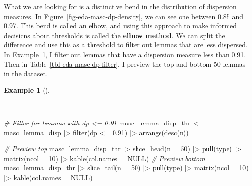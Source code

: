 \documentclass[
  letterpaper,
]{latex/krantz}
\newenvironment{Shaded}{\begin{snugshade}}{\end{snugshade}}
\newcommand{\AttributeTok}[1]{\textcolor[rgb]{0.00,0.00,0.00}{#1}}
\newcommand{\CommentTok}[1]{\textcolor[rgb]{0.00,0.00,0.00}{\textit{#1}}}
\newcommand{\ConstantTok}[1]{\textcolor[rgb]{0.00,0.00,0.00}{#1}}
\newcommand{\DecValTok}[1]{\textcolor[rgb]{0.00,0.00,0.00}{#1}}
\newcommand{\FloatTok}[1]{\textcolor[rgb]{0.00,0.00,0.00}{#1}}
\newcommand{\FunctionTok}[1]{\textcolor[rgb]{0.00,0.00,0.00}{#1}}
\newcommand{\NormalTok}[1]{\textcolor[rgb]{0.00,0.00,0.00}{#1}}
\newcommand{\OtherTok}[1]{\textcolor[rgb]{0.00,0.00,0.00}{#1}}
\newcommand{\SpecialCharTok}[1]{\textcolor[rgb]{0.00,0.00,0.00}{#1}}
\theoremstyle{definition}
\newtheorem{example}{Example}[chapter]
\theoremstyle{remark}
\begin{document}
What we are looking for is a distinctive bend in the distribution of
dispersion measures. In Figure~\ref{fig-eda-masc-dp-density}, we can see
one between 0.85 and 0.97. This bend is called an elbow, and using this
approach to make informed decisions about thresholds is called the
\textbf{elbow method}. We can split the difference and use this as a
threshold to filter out lemmas that are less dispersed. In
Example~\ref{exm-eda-masc-dp-filter}, I filter out lemmas that have a
dispersion measure less than 0.91. Then in
Table~\ref{tbl-eda-masc-dp-filter}, I preview the top and bottom 50
lemmas in the dataset.

\begin{example}[]\protect\hypertarget{exm-eda-masc-dp-filter}{}\label{exm-eda-masc-dp-filter}

~

\begin{Shaded}
\begin{Highlighting}[]
\CommentTok{\# Filter for lemmas with dp \textless{}= 0.91}
\NormalTok{masc\_lemma\_disp\_thr }\OtherTok{\textless{}{-}}
\NormalTok{  masc\_lemma\_disp }\SpecialCharTok{|\textgreater{}}
  \FunctionTok{filter}\NormalTok{(dp }\SpecialCharTok{\textless{}=} \FloatTok{0.91}\NormalTok{) }\SpecialCharTok{|\textgreater{}}
  \FunctionTok{arrange}\NormalTok{(}\FunctionTok{desc}\NormalTok{(n))}

\CommentTok{\# Preview top}
\NormalTok{masc\_lemma\_disp\_thr }\SpecialCharTok{|\textgreater{}}
  \FunctionTok{slice\_head}\NormalTok{(}\AttributeTok{n =} \DecValTok{50}\NormalTok{) }\SpecialCharTok{|\textgreater{}}
  \FunctionTok{pull}\NormalTok{(type) }\SpecialCharTok{|\textgreater{}}
  \FunctionTok{matrix}\NormalTok{(}\AttributeTok{ncol =} \DecValTok{10}\NormalTok{) }\SpecialCharTok{|\textgreater{}}
  \FunctionTok{kable}\NormalTok{(}\AttributeTok{col.names =} \ConstantTok{NULL}\NormalTok{)}
\CommentTok{\# Preview bottom}
\NormalTok{masc\_lemma\_disp\_thr }\SpecialCharTok{|\textgreater{}}
  \FunctionTok{slice\_tail}\NormalTok{(}\AttributeTok{n =} \DecValTok{50}\NormalTok{) }\SpecialCharTok{|\textgreater{}}
  \FunctionTok{pull}\NormalTok{(type) }\SpecialCharTok{|\textgreater{}}
  \FunctionTok{matrix}\NormalTok{(}\AttributeTok{ncol =} \DecValTok{10}\NormalTok{) }\SpecialCharTok{|\textgreater{}}
  \FunctionTok{kable}\NormalTok{(}\AttributeTok{col.names =} \ConstantTok{NULL}\NormalTok{)}
\end{Highlighting}
\end{Shaded}

\begin{table}


\end{table}
\end{example}
\end{document}
